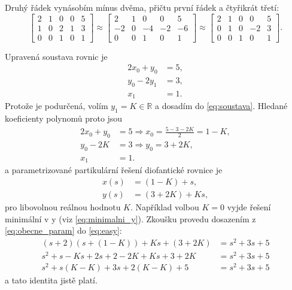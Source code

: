 \documentclass[twoside]{article}
\begin{document}
Druhý řádek vynásobím mínus dvěma, přičtu první řádek a čtyřikrát třetí:
\begin{equation}
	\left[
\begin{array}{cccc|c}
	2 & 1 & 0 & 0 & 5\\
	1 & 0 & 2 & 1 & 3\\
	0 & 0 & 1 & 0 & 1
\end{array}
\right] \approx
	\left[
		\begin{array}{cccc|c}
			2 & 1 & 0 & 0 & 5\\
			-2 & 0 & -4 & -2 & -6\\
			0 & 0 & 1 & 0 & 1
		\end{array}
		\right] \approx 	\left[
			\begin{array}{cccc|c}
				2 & 1 & 0 & 0 & 5\\
				0 & 1 & 0 & -2 & 3\\
				0 & 0 & 1 & 0 & 1
			\end{array}
			\right].
	\end{equation}

Upravená soustava rovnic je 
\begin{equation}
	\label{eq:soustava}
	\begin{aligned}
		2x_0 + y_0 &= 5,\\
		y_0 - 2 y_1 &= 3, \\
		x_1 &= 1.
	\end{aligned}
\end{equation}
Protože je podurčená, volím $y_1 = K \in \mathbb{R}$ a dosadím do \eqref{eq:soustava}. Hledané koeficienty polynomů proto jsou
\begin{equation}
	\begin{aligned}
		2x_0 + y_0 &= 5 \Rightarrow x_0 = \frac{5-3 - 2 K}{2} = 1-K,\\
		y_0 - 2 K &= 3 \Rightarrow y_0 = 3 + 2K, \\
		x_1 &= 1.
	\end{aligned}
\end{equation}
a parametrizované partikulární řešení diofantické rovnice je
\begin{equation}
	\begin{aligned}
		x(s) &= (1-K) + s, \\
		y(s) &= (3+2K) + Ks,
	\end{aligned}
	\label{eq:obecne_param}
\end{equation}
pro libovolnou reálnou hodnotu $K$. Například volbou $K = 0$ vyjde řešení minimální v y (viz \eqref{eq:minimalni_y}).
Zkoušku provedu dosazením z \eqref{eq:obecne_param} do \eqref{eq:easy}:
\begin{equation}
	\begin{aligned}
		(s+2)(s + (1-K)) + Ks + (3+2K) &= s^2 + 3s + 5\\
		s^2 + s - Ks + 2s + 2-2K + Ks + 3 + 2K &= s^2 + 3s + 5 \\
		s^2 + s(K-K) + 3s  + 2 (K-K) + 5 &= s^2 + 3s + 5
	\end{aligned}
\end{equation}
a tato identita jistě platí.
\end{document}
